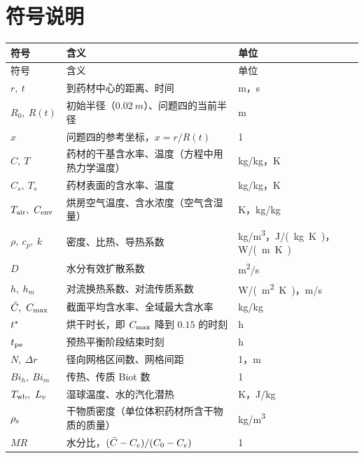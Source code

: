 \section{符号说明}\label{sec:symbols}

\begingroup
\small
\setcounter{symtblsave}{\value{table}}
\renewcommand{\arraystretch}{1.22}
\begin{longtable}{C{2.6cm}C{8.6cm}C{3.4cm}}
\toprule
符号 & 含义 & 单位 \\
\midrule
\endfirsthead
\toprule
符号 & 含义 & 单位 \\
\midrule
\endhead
\bottomrule
\endlastfoot
$r,\ t$ & 到药材中心的距离、时间 & \si{m}，\si{s} \\
$R_0,\ R(t)$ & 初始半径（$\SI{0.02}{m}$）、问题四的当前半径 & \si{m} \\
$x$ & 问题四的参考坐标，$x=r/R(t)$ & 1 \\
$C,\ T$ & 药材的干基含水率、温度（方程中用热力学温度） & \si{kg/kg}，\si{K} \\
$C_s,\ T_s$ & 药材表面的含水率、温度 & \si{kg/kg}，\si{K} \\
$T_{\mathrm{air}},\ C_{\mathrm{env}}$ & 烘房空气温度、含水浓度（空气含湿量） & \si{K}，\si{kg/kg} \\
$\rho,\ c_p,\ k$ & 密度、比热、导热系数 & \si{kg/m^3}，\si{J/(kg.K)}，\si{W/(m.K)} \\
$D$ & 水分有效扩散系数 & \si{m^2/s} \\
$h,\ h_m$ & 对流换热系数、对流传质系数 & \si{W/(m^2.K)}，\si{m/s} \\
$\bar{C},\ C_{\max}$ & 截面平均含水率、全域最大含水率 & \si{kg/kg} \\
$t^{*}$ & 烘干时长，即 $C_{\max}$ 降到 $0.15$ 的时刻 & \si{h} \\
$t_{\mathrm{pe}}$ & 预热平衡阶段结束时刻 & \si{h} \\
$N,\ \Delta r$ & 径向网格区间数、网格间距 & 1，\si{m} \\
$Bi_h,\ Bi_m$ & 传热、传质 Biot 数 & 1 \\
$T_{\mathrm{wb}},\ L_v$ & 湿球温度、水的汽化潜热 & \si{K}，\si{J/kg} \\
$\rho_{\mathrm{s}}$ & 干物质密度（单位体积药材所含干物质的质量） & \si{kg/m^3} \\
$\mathit{MR}$ & 水分比，$(\bar{C}-C_e)/(C_0-C_e)$ & 1 \\
\end{longtable}
\setcounter{table}{\value{symtblsave}}
\endgroup
